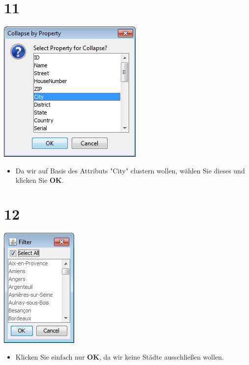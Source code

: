\documentclass{beamer}
\begin{document}
\section{11}
\begin{frame}
	\begin{center}
  		\includegraphics[height=0.5\textheight]{11.png}
	\end{center}
	\begin{itemize}
		\item Da wir auf Basis des Attributs "City" clustern wollen, wählen Sie dieses und klicken Sie \textbf{OK}.
	\end{itemize}
\end{frame}

\section{12}
\begin{frame}
	\begin{center}
  		\includegraphics[height=0.5\textheight]{12.png}
	\end{center}
	\begin{itemize}
		\item Klicken Sie einfach nur \textbf{OK}, da wir keine Städte ausschließen wollen.
	\end{itemize}
\end{frame}
\end{document}
